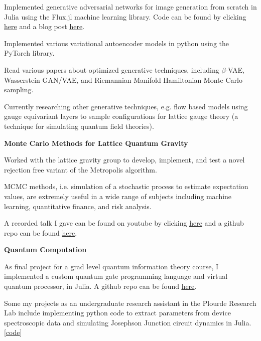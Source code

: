\documentclass[9pt]{extarticle}
\begin{document}
\begin{compactitem}
\item Implemented generative adversarial networks for image generation from scratch in Julia using the Flux.jl machine learning library. Code can be found by clicking \href{https://github.com/aarontrowbridge/FluxGAN.jl}{\underline{here}} and a blog post \href{https://aarontrowbridge.github.io/posts/generative-adversarial-nets/}{\underline{here}}.
\item Implemented various variational autoencoder models in python using the PyTorch library. 
\item Read various papers about optimized generative techniques, including $\beta$-VAE, Wasserstein GAN/VAE, and Riemannian Manifold Hamiltonian Monte Carlo sampling. 
\item Currently researching other generative techniques, e.g. flow based models using gauge equivariant layers to sample configurations for lattice gauge theory (a technique for simulating quantum field theories).
\end{compactitem}


\vspace{2.5pt}
\large\textbf{Monte Carlo Methods for Lattice Quantum Gravity}
\normalsize

\begin{compactitem}
\item Worked with the lattice gravity group to develop, implement, and test a novel rejection free variant of the Metropolis algorithm.
\item MCMC methods, i.e. simulation of a stochastic process to estimate expectation values, are extremely useful in a wide range of subjects including machine learning, quantitative finance, and risk analysis.
\item A recorded talk I gave can be found on youtube by clicking \href{https://www.youtube.com/watch?v=_Ppx0e3aG-E&t=2s}{\underline{here}} and a github repo can be found \href{https://github.com/aarontrowbridge/Ising}{\underline{here}}.
\end{compactitem}

\vspace{2.5pt}
\large\textbf{Quantum Computation}
\normalsize

\begin{compactitem}
\item As final project for a grad level quantum information theory course, I implemented a custom quantum gate programming language and virtual quantum processor, in Julia. A github repo can be found \href{https://github.com/aarontrowbridge/QuIPS}{\underline{here}}.
\item Some my projects as an undergraduate research assistant in the Plourde Research Lab include implementing python code to extract parameters from device spectroscopic data and simulating Josephson Junction circuit dynamics in Julia. [\href{https://github.com/aarontrowbridge/cQED}{\underline{code}}] 
\end{compactitem}
\end{document}
